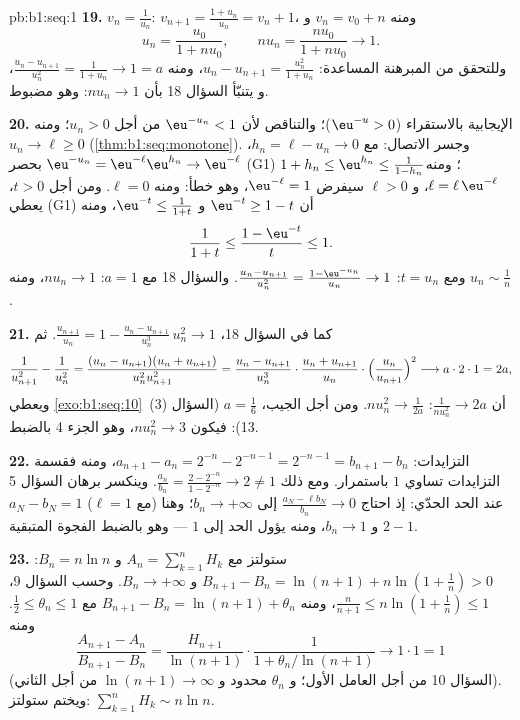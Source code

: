\begin{solution}{pb:b1:seq:1}
\textbf{19.} $v_n = \frac{1}{u_n}$: $v_{n+1} = \frac{1 +
u_n}{u_n} = v_n + 1$، ومنه $v_n = v_0 + n$ و
\[
u_n = \frac{u_0}{1 + n u_0} , \qquad
n u_n = \frac{n u_0}{1 + n u_0} \longrightarrow 1 .
\]
وللتحقق من المبرهنة المساعدة: $u_n - u_{n+1} = \frac{u_n^2}{1 + u_n}$، ومنه
$\frac{u_n - u_{n+1}}{u_n^2} = \frac{1}{1 + u_n} \to 1 = a$، و
يتنبّأ السؤال 18 بأن $n u_n \to 1$: وهو  مضبوط.

\textbf{20.} الإيجابية بالاستقراء ($\eu^{-u} > 0$)؛
والتناقص لأن $\eu^{-u_n} < 1$ من أجل $u_n > 0$؛ ومنه $u_n \to
\ell \geq 0$ (\cref{thm:b1:seq:monotone}). وجسر الاتصال:
مع $h_n = \ell - u_n \to 0$، $\eu^{-u_n} = \eu^{-\ell}
\eu^{h_n} \to \eu^{-\ell}$ بحصر (G1) $1 + h_n \leq
\eu^{h_n} \leq \frac{1}{1 - h_n}$؛ ومنه $\ell = \ell\,
\eu^{-\ell}$، و $\ell > 0$ سيفرض $\eu^{-\ell} = 1$،
وهو خطأ: ومنه $\ell = 0$. ومن أجل $t > 0$، يعطي (G1) أن $\eu^{-t} \geq 1 - t$
و $\eu^{-t} \leq \frac{1}{1 + t}$، ومنه
\[
\frac{1}{1 + t} \leq \frac{1 - \eu^{-t}}{t} \leq 1 .
\]
ومع $t = u_n$: $\frac{u_n - u_{n+1}}{u_n^2} = \frac{1 -
\eu^{-u_n}}{u_n} \to 1$. والسؤال 18 مع $a = 1$: $n u_n \to
1$، ومنه $u_n \sim \frac1n$.

\textbf{21.} كما في السؤال 18، $\frac{u_{n+1}}{u_n} = 1 -
\frac{u_n - u_{n+1}}{u_n^3}\,u_n^2 \to 1$. ثم
\[
\frac{1}{u_{n+1}^2} - \frac{1}{u_n^2}
= \frac{(u_n - u_{n+1})(u_n + u_{n+1})}{u_n^2 u_{n+1}^2}
= \frac{u_n - u_{n+1}}{u_n^3}\cdot
\frac{u_n + u_{n+1}}{u_n}\cdot
\Bigl(\frac{u_n}{u_{n+1}}\Bigr)^2
\longrightarrow a \cdot 2 \cdot 1 = 2a ,
\]
ويعطي \cref{exo:b1:seq:10}~(3) أن $\frac{1}{n u_n^2} \to 2a$:
$n u_n^2 \to \frac{1}{2a}$. ومن أجل الجيب، $a = \frac16$
(السؤال 13): فيكون $n u_n^2 \to 3$، وهو الجزء 4 بالضبط.

\textbf{22.} التزايدات: $a_{n+1} - a_n = 2^{-n} - 2^{-n-1} =
2^{-n-1} = b_{n+1} - b_n$، ومنه فقسمة التزايدات
تساوي $1$ باستمرار. ومع ذلك $\frac{a_n}{b_n} = \frac{2 - 2^{-n}}{1 -
2^{-n}} \to 2 \neq 1$. وينكسر برهان السؤال 5 عند
الحد الحدّي: إذ احتاج $\frac{a_N - \ell b_N}{b_n} \to 0$ إلى $b_n
\to +\infty$؛ وهنا (مع $\ell = 1$) $a_N - b_N = 1$ و $b_n
\to 1$، ومنه يؤول الحد إلى $1$ --- وهو بالضبط الفجوة المتبقية
$2 - 1$.

\textbf{23.} ستولتز مع $A_n = \sum_{k=1}^n H_k$ و $B_n = n\ln
n$: $B_{n+1} - B_n = \ln(n+1) + n\ln(1 + \frac1n) > 0$ و $B_n
\to +\infty$. وحسب السؤال 9، $\frac{n}{n+1} \leq n\ln(1 +
\frac1n) \leq 1$، ومنه $B_{n+1} - B_n = \ln(n+1) + \theta_n$ مع
$\frac12 \leq \theta_n \leq 1$. ومنه
\[
\frac{A_{n+1} - A_n}{B_{n+1} - B_n}
= \frac{H_{n+1}}{\ln(n+1)}\cdot
\frac{1}{1 + \theta_n/\ln(n+1)} \longrightarrow 1 \cdot 1 = 1
\]
(السؤال 10 من أجل العامل الأول؛ و $\theta_n$ محدود و
$\ln(n+1) \to \infty$ من أجل الثاني). ويختم ستولتز:
$\sum_{k=1}^n H_k \sim n\ln n$.


\end{solution}
